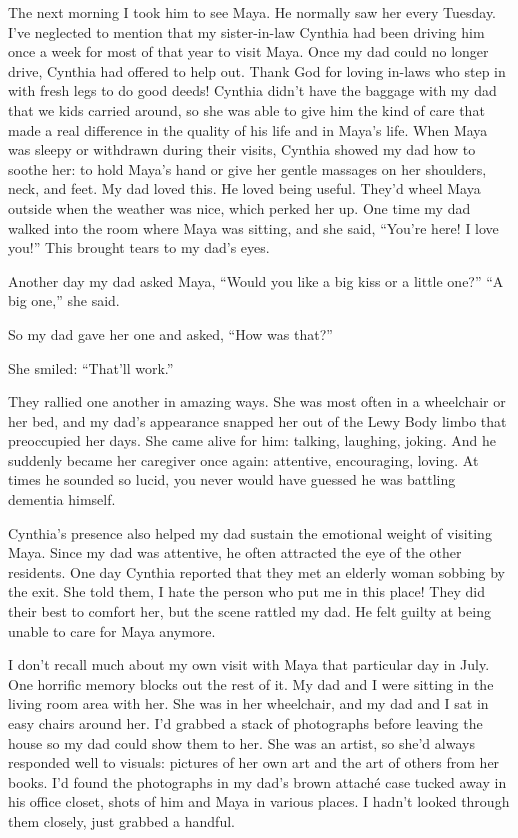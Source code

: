 \documentclass[12pt]{book}
\begin{document}
The next morning I took him to see Maya. He normally saw her every Tuesday. I've neglected to mention that my sister-in-law Cynthia had been driving him once a week for most of that year to visit Maya. Once my dad could no longer drive, Cynthia had offered to help out. Thank God for loving in-laws who step in with fresh legs to do good deeds! Cynthia didn't have the baggage with my dad that we kids carried around, so she was able to give him the kind of care that made a real difference in the quality of his life and in Maya's life. When Maya was sleepy or withdrawn during their visits, Cynthia showed my dad how to soothe her: to hold Maya's hand or give her gentle massages on her shoulders, neck, and feet. My dad loved this. He loved being useful. They'd wheel Maya outside when the weather was nice, which perked her up. One time my dad walked into the room where Maya was sitting, and she said, ``You're here! I love you!'' This brought tears to my dad's eyes.

Another day my dad asked Maya, ``Would you like a big kiss or a little one?'' ``A big one,'' she said.

So my dad gave her one and asked, ``How was that?''

She smiled: ``That'll work.''

They rallied one another in amazing ways. She was most often in a wheelchair or her bed, and my dad's appearance snapped her out of the Lewy Body limbo that preoccupied her days. She came alive for him: talking, laughing, joking. And he suddenly became her caregiver once again: attentive, encouraging, loving. At times he sounded so lucid, you never would have guessed he was battling dementia himself.

Cynthia's presence also helped my dad sustain the emotional weight of visiting Maya. Since my dad was attentive, he often attracted the eye of the other residents. One day Cynthia reported that they met an elderly woman sobbing by the exit. She told them, I hate the person who put me in this place! They did their best to comfort her, but the scene rattled my dad. He felt guilty at being unable to care for Maya anymore.

I don't recall much about my own visit with Maya that particular day in July. One horrific memory blocks out the rest of it. My dad and I were sitting in the living room area with her. She was in her wheelchair, and my dad and I sat in easy chairs around her. I'd grabbed a stack of photographs before leaving the house so my dad could show them to her. She was an artist, so she'd always responded well to visuals: pictures of her own art and the art of others from her books. I'd found the photographs in my dad's brown attach\'e case tucked away in his office closet, shots of him and Maya in various places. I hadn't looked through them closely, just grabbed a handful.
\end{document}
